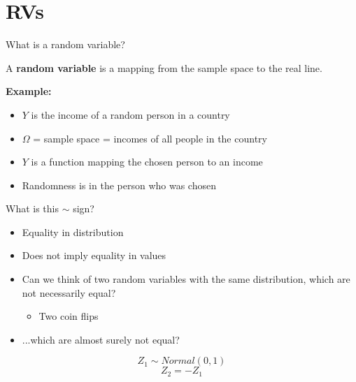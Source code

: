 \documentclass{beamer}
\begin{document}
\section{RVs}
\begin{frame}{What is a random variable?}
\begin{definition}
A \textbf{random variable} is a mapping from the sample space to the real line.
\end{definition}
\textbf{Example:}
\begin{itemize}
  \item $Y$ is the income of a random person in a country
  \item $\Omega$ = sample space = incomes of all people in the country
  \item $Y$ is a function mapping the chosen person to an income
  \item Randomness is in the person who was chosen
\end{itemize}
\end{frame}

\begin{frame}{What is this $\sim$ sign?}
\begin{itemize}
\item Equality in distribution
\item Does not imply equality in values
\pause
\item Can we think of two random variables with the same distribution, which are not necessarily equal?
\pause
\begin{itemize}
\item Two coin flips
\end{itemize}
\pause
\item ...which are almost surely not equal?
\end{itemize}
\pause
$$Z_1\sim Normal(0,1)$$
$$Z_2=-Z_1$$
\end{frame}
\end{document}
